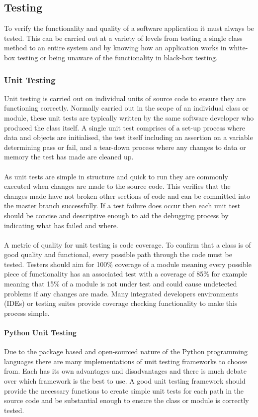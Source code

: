\subsection{Testing}
	To verify the functionality and quality of a software application it must always be tested. This can be carried out at a variety of levels from testing a single class method to an entire system and by knowing how an application works in white-box testing or being unaware of the functionality in black-box testing.
	\subsubsection{Unit Testing}
		Unit testing is carried out on individual units of source code to ensure they are functioning correctly. Normally carried out in the scope of an individual class or module, these unit tests are typically written by the same software developer who produced the class itself. A single unit test comprises of a set-up process where data and objects are initialised, the test itself including an assertion on a variable determining pass or fail, and a tear-down process where any changes to data or memory the test has made are cleaned up.
		\\\\
		As unit tests are simple in structure and quick to run they are commonly executed when changes are made to the source code. This verifies that the changes made have not broken other sections of code and can be committed into the master branch successfully. If a test failure does occur then each unit test should be concise and descriptive enough to aid the debugging process by indicating what has failed and where.
		\\\\
		A metric of quality for unit testing is code coverage. To confirm that a class is of good quality and functional, every possible path through the code must be tested. Testers should aim for 100\% coverage of a module meaning every possible piece of functionality has an associated test with a coverage of 85\% for example meaning that 15\% of a module is not under test and could cause undetected problems if any changes are made. Many integrated developers environments (IDEs) or testing suites provide coverage checking functionality to make this process simple.
		\paragraph{Python Unit Testing}
			Due to the package based and open-sourced nature of the Python programming languages there are many implementations of unit testing frameworks to choose from. Each has its own advantages and disadvantages and there is much debate over which framework is the best to use. A good unit testing framework should provide the necessary functions to create simple unit tests for each path in the source code and be substantial enough to ensure the class or module is correctly tested.

